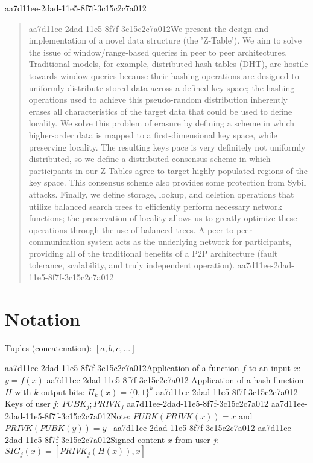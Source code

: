 \documentclass[12pt]{article}
\begin{document}
aa7d11ee-2dad-11e5-8f7f-3c15c2c7a012
\maketitle

\begin{abstract}
aa7d11ee-2dad-11e5-8f7f-3c15c2c7a012We present the design and implementation of a novel data structure (the 'Z-Table'). We aim to solve the issue of window/range-based queries in peer to peer architectures. Traditional models, for example,  distributed hash tables (DHT), are hostile towards window queries because their hashing operations are designed to uniformly distribute stored data across a defined key space; the hashing operations used to achieve this pseudo-random distribution inherently erases all characteristics of the target data that could be used to define locality. We solve this problem of erasure by defining a scheme in which higher-order data is mapped to a first-dimensional key space, while preserving locality. The resulting keys pace is very definitely not uniformly distributed, so we define a distributed consensus scheme in which participants in our Z-Tables agree to target highly populated regions of the key space. This consensus scheme also provides some protection from Sybil attacks. Finally, we define storage, lookup, and deletion operations that utilize balanced search trees to efficiently perform necessary network functions; the preservation of locality allows us to greatly optimize these operations through the use of balanced trees. A peer to peer communication system acts as the underlying network for participants, providing all of the traditional benefits of a P2P architecture (fault tolerance, scalability, and truly independent operation).
aa7d11ee-2dad-11e5-8f7f-3c15c2c7a012\end{abstract}

\section{Notation}

Tuples (concatenation): $[a,b,c,...]$

aa7d11ee-2dad-11e5-8f7f-3c15c2c7a012Application of a function $f$ to an input $x$: $y=f(x)$
aa7d11ee-2dad-11e5-8f7f-3c15c2c7a012
Application of a hash function $H$ with $k$ output bits: $H_{k}(x) = \{0,1\}^k$
aa7d11ee-2dad-11e5-8f7f-3c15c2c7a012
Keys of user $j$: $ PUBK_j; PRIVK_j $
aa7d11ee-2dad-11e5-8f7f-3c15c2c7a012
aa7d11ee-2dad-11e5-8f7f-3c15c2c7a012Note: $PUBK(PRIVK(x)) = x$ and $PRIVK(PUBK(y)) = y$~
aa7d11ee-2dad-11e5-8f7f-3c15c2c7a012
aa7d11ee-2dad-11e5-8f7f-3c15c2c7a012Signed content $x$ from user $j$: $SIG_j(x) = \left[ PRIVK_j( H(x) ), x \right]$
\end{document}
